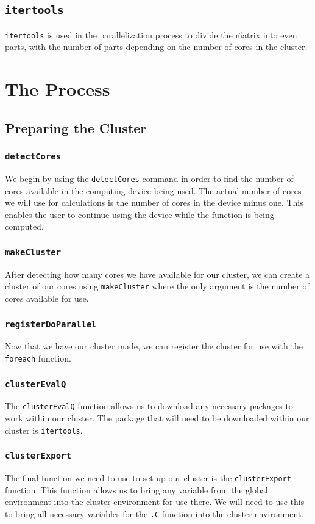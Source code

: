 \documentclass{article}
\begin{document}
\subsection{\texttt{itertools}}
\texttt{itertools} is used in the parallelization process to divide the \u matrix into even parts, with the number of parts depending on the number of cores in the cluster. 

\section{The Process}
\subsection{Preparing the Cluster}
\subsubsection{\texttt{detectCores}}
We begin by using the \texttt{detectCores} command in order to find the number of cores available in the computing device being used. The actual number of cores we will use for calculations is the number of cores in the device minus one. This enables the user to continue using the device while the function is being computed. 

\subsubsection{\texttt{makeCluster}}
After detecting how many cores we have available for our cluster, we can create a cluster of our cores using \texttt{makeCluster} where the only argument is the number of cores available for use. 

\subsubsection{\texttt{registerDoParallel}}
Now that we have our cluster made, we can register the cluster for use with the \texttt{foreach} function.

\subsubsection{\texttt{clusterEvalQ}}
The \texttt{clusterEvalQ} function allows us to download any necessary packages to work within our cluster. The package that will need to be downloaded within our cluster is \texttt{itertools}.

\subsubsection{\texttt{clusterExport}}
The final function we need to use to set up our cluster is the \texttt{clusterExport} function. This function allows us to bring any variable from the global environment into the cluster environment for use there. We will need to use this to bring all necessary variables for the \texttt{.C} function into the cluster environment.
\end{document}
